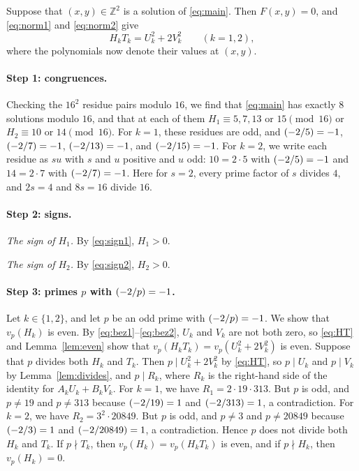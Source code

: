 \documentclass[11pt]{article}
\newcommand{\Z}{\mathbb{Z}}
\newcommand{\leg}[2]{\mathchoice{\biggl(\dfrac{#1}{#2}\biggr)}{(#1/#2)}{(#1/#2)}{(#1/#2)}}
\begin{document}
Suppose that $(x,y)\in\Z^2$ is a solution of \eqref{eq:main}. Then $F(x,y)=0$, and \eqref{eq:norm1} and \eqref{eq:norm2} give
\begin{equation}\label{eq:HT}
H_kT_k=U_k^2+2V_k^2\qquad(k=1,2),
\end{equation}
where the polynomials now denote their values at $(x,y)$.

\paragraph{Step 1: congruences.} Checking the $16^2$ residue pairs modulo $16$, we find that \eqref{eq:main} has exactly 8 solutions modulo $16$, and that at each of them $H_{1}\equiv5,\allowbreak 7,\allowbreak 13\text{ or }15\pmod{16}$ or $H_{2}\equiv10\text{ or }14\pmod{16}$. For $k=1$, these residues are odd, and $\leg{-2}{5}=-1$, $\leg{-2}{7}=-1$, $\leg{-2}{13}=-1$, and $\leg{-2}{15}=-1$. For $k=2$, we write each residue as $su$ with $s$ and $u$ positive and $u$ odd: $10=2\cdot5$ with $\leg{-2}{5}=-1$ and $14=2\cdot7$ with $\leg{-2}{7}=-1$. Here for $s=2$, every prime factor of $s$ divides $4$, and $2s=4$ and $8s=16$ divide $16$.

\paragraph{Step 2: signs.} \emph{The sign of $H_{1}$.} By \eqref{eq:sign1}, $H_{1}>0$.

\emph{The sign of $H_{2}$.} By \eqref{eq:sign2}, $H_{2}>0$.

\paragraph{Step 3: primes $p$ with $\leg{-2}{p}=-1$.} Let $k\in\{1,2\}$, and let $p$ be an odd prime with $\leg{-2}{p}=-1$. We show that $v_p(H_k)$ is even. By \eqref{eq:bez1}--\eqref{eq:bez2}, $U_k$ and $V_k$ are not both zero, so \eqref{eq:HT} and Lemma~\ref{lem:even} show that $v_p(H_kT_k)=v_p(U_k^2+2V_k^2)$ is even. Suppose that $p$ divides both $H_k$ and $T_k$. Then $p\mid U_k^2+2V_k^2$ by \eqref{eq:HT}, so $p\mid U_k$ and $p\mid V_k$ by Lemma~\ref{lem:divides}, and $p\mid R_k$, where $R_k$ is the right-hand side of the identity for $A_kU_k+B_kV_k$. For $k=1$, we have $R_{1}=2\cdot 19\cdot 313$. But $p$ is odd, and $p\neq19$ and $p\neq313$ because $\leg{-2}{19}=1$ and $\leg{-2}{313}=1$, a contradiction. For $k=2$, we have $R_{2}=3^{2}\cdot 20849$. But $p$ is odd, and $p\neq3$ and $p\neq20849$ because $\leg{-2}{3}=1$ and $\leg{-2}{20849}=1$, a contradiction. Hence $p$ does not divide both $H_k$ and $T_k$. If $p\nmid T_k$, then $v_p(H_k)=v_p(H_kT_k)$ is even, and if $p\nmid H_k$, then $v_p(H_k)=0$.
\end{document}
